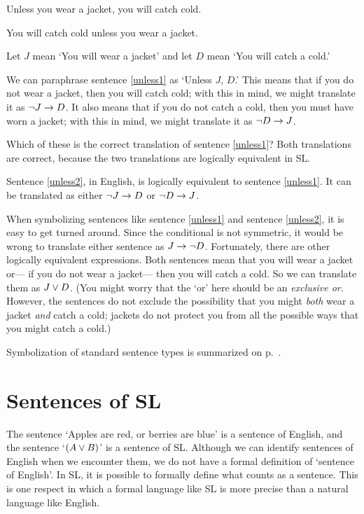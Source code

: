 \begin{earg}
\item[\ex{unless1}] Unless you wear a jacket, you will catch cold. 
\item[\ex{unless2}] You will catch cold unless you wear a jacket. 
\end{earg}

Let $J$ mean `You will wear a jacket' and let $D$ mean `You will catch a cold.'

We can paraphrase sentence \ref{unless1} as `Unless $J$, $D$.' This means that if you do not wear a jacket, then you will catch cold; with this in mind, we might translate it as $\neg J \rightarrow D$. It also means that if you do not catch a cold, then you must have worn a jacket; with this in mind, we might translate it as $\neg D \rightarrow J$.

Which of these is the correct translation of sentence \ref{unless1}? Both translations are correct, because the two translations are logically equivalent in SL.

Sentence \ref{unless2}, in English, is logically equivalent to sentence \ref{unless1}. It can be translated as either $\neg J \rightarrow D$ or $\neg D \rightarrow J$.

When symbolizing sentences like sentence \ref{unless1} and sentence \ref{unless2}, it is easy to get turned around. Since the conditional is not symmetric, it would be wrong to translate either sentence as $J \rightarrow \neg D$. Fortunately, there are other logically equivalent expressions. Both sentences mean that you will wear a jacket or--- if you do not wear a jacket--- then you will catch a cold. So we can translate them as $J \vee D$. (You might worry that the `or' here should be an \emph{exclusive or}. However, the sentences do not exclude the possibility that you might \emph{both} wear a jacket \emph{and} catch a cold; jackets do not protect you from all the possible ways that you might catch a cold.)



Symbolization of standard sentence types is summarized on p.~\pageref{app.symbolization}.





\section{Sentences of SL}
The sentence `Apples are red, or berries are blue' is a sentence of English, and the sentence `$(A\vee B)$' is a sentence of SL. Although we can identify sentences of English when we encounter them, we do not have a formal definition of `sentence of English'. In SL, it is possible to formally define what counts as a sentence. This is one respect in which a formal language like SL is more precise than a natural language like English.


